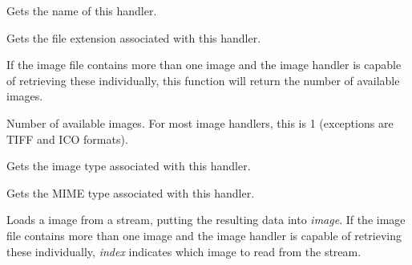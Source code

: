 Gets the name of this handler.



Gets the file extension associated with this handler.

\label{wximagehandlergetimagecount}


If the image file contains more than one image and the image handler is capable 
of retrieving these individually, this function will return the number of
available images.



Number of available images. For most image handlers, this is 1 (exceptions
are TIFF and ICO formats).



Gets the image type associated with this handler.



Gets the MIME type associated with this handler.

\label{wximagehandlerloadfile}


Loads a image from a stream, putting the resulting data into {\it image}. If the image file contains
more than one image and the image handler is capable of retrieving these individually, {\it index}
indicates which image to read from the stream.





